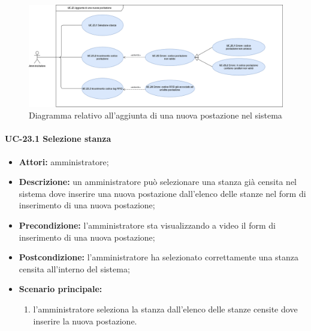 \begin{figure}[H]
    \centering
      \includegraphics[scale=0.30]{src/CasiDUso/immagini/AggiuntaPostazione.png}
    \caption{Diagramma relativo all'aggiunta di una nuova postazione nel sistema}
\end{figure}

\paragraph{UC-23.1 Selezione stanza}
\begin{itemize}
    \item \textbf{Attori:} amministratore;
    \item \textbf{Descrizione:} un amministratore pu\`{o} selezionare una stanza già censita nel sistema dove inserire una nuova postazione dall'elenco delle stanze nel form di inserimento di una nuova postazione;
    \item \textbf{Precondizione:} l'amministratore sta visualizzando a video il form di inserimento di una nuova postazione;
    \item \textbf{Postcondizione:} l'amministratore ha selezionato correttamente una stanza censita all'interno del sistema;
    \item \textbf{Scenario principale:}
    \begin{enumerate}
        \item l'amministratore seleziona la stanza dall'elenco delle stanze censite dove inserire la nuova postazione.
    \end{enumerate}
\end{itemize}


